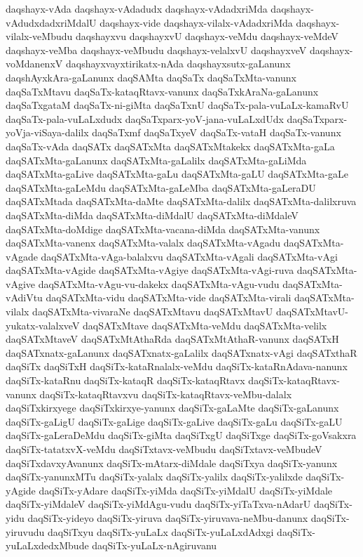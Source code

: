 {daqshayx-vAda
daqshayx-vAdadudx
daqshayx-vAdadxriMda
daqshayx-vAdudxdadxriMdalU
daqshayx-vide
daqshayx-vilalx-vAdadxriMda
daqshayx-vilalx-veMbudu
daqshayxvu
daqshayxvU
daqshayx-veMdu
daqshayx-veMdeV
daqshayx-veMba
daqshayx-veMbudu
daqshayx-velalxvU
daqshayxveV
daqshayx-voMdanenxV
daqshayxvayxtirikatx-nAda
daqshayxsutx-gaLanunx
daqshAyxkAra-gaLanunx
daqSAMta
daqSaTx
daqSaTxMta-vanunx
daqSaTxMtavu
daqSaTx-kataqRtavx-vanunx
daqSaTxkAraNa-gaLanunx
daqSaTxgataM
daqSaTx-ni-giMta
daqSaTxnU
daqSaTx-pala-vuLaLx-kamaRvU
daqSaTx-pala-vuLaLxdudx
daqSaTxparx-yoV-jana-vuLaLxdUdx
daqSaTxparx-yoVja-viSaya-dalilx
daqSaTxmf
daqSaTxyeV
daqSaTx-vataH
daqSaTx-vanunx
daqSaTx-vAda
daqSATx
daqSATxMta
daqSATxMtakekx
daqSATxMta-gaLa
daqSATxMta-gaLanunx
daqSATxMta-gaLalilx
daqSATxMta-gaLiMda
daqSATxMta-gaLive
daqSATxMta-gaLu
daqSATxMta-gaLU
daqSATxMta-gaLe
daqSATxMta-gaLeMdu
daqSATxMta-gaLeMba
daqSATxMta-gaLeraDU
daqSATxMtada
daqSATxMta-daMte
daqSATxMta-dalilx
daqSATxMta-dalilxruva
daqSATxMta-diMda
daqSATxMta-diMdalU
daqSATxMta-diMdaleV
daqSATxMta-doMdige
daqSATxMta-vacana-diMda
daqSATxMta-vanunx
daqSATxMta-vanenx
daqSATxMta-valalx
daqSATxMta-vAgadu
daqSATxMta-vAgade
daqSATxMta-vAga-balalxvu
daqSATxMta-vAgali
daqSATxMta-vAgi
daqSATxMta-vAgide
daqSATxMta-vAgiye
daqSATxMta-vAgi-ruva
daqSATxMta-vAgive
daqSATxMta-vAgu-vu-dakekx
daqSATxMta-vAgu-vudu
daqSATxMta-vAdiVtu
daqSATxMta-vidu
daqSATxMta-vide
daqSATxMta-virali
daqSATxMta-vilalx
daqSATxMta-vivaraNe
daqSATxMtavu
daqSATxMtavU
daqSATxMtavU-yukatx-valalxveV
daqSATxMtave
daqSATxMta-veMdu
daqSATxMta-velilx
daqSATxMtaveV
daqSATxMtAthaRda
daqSATxMtAthaR-vanunx
daqSATxH
daqSATxnatx-gaLanunx
daqSATxnatx-gaLalilx
daqSATxnatx-vAgi
daqSATxthaR
daqSiTx
daqSiTxH
daqSiTx-kataRnalalx-veMdu
daqSiTx-kataRnAdava-nanunx
daqSiTx-kataRnu
daqSiTx-kataqR
daqSiTx-kataqRtavx
daqSiTx-kataqRtavx-vanunx
daqSiTx-kataqRtavxvu
daqSiTx-kataqRtavx-veMbu-dalalx
daqSiTxkirxyege
daqSiTxkirxye-yanunx
daqSiTx-gaLaMte
daqSiTx-gaLanunx
daqSiTx-gaLigU
daqSiTx-gaLige
daqSiTx-gaLive
daqSiTx-gaLu
daqSiTx-gaLU
daqSiTx-gaLeraDeMdu
daqSiTx-giMta
daqSiTxgU
daqSiTxge
daqSiTx-goVsakxra
daqSiTx-tatatxvX-veMdu
daqSiTxtavx-veMbudu
daqSiTxtavx-veMbudeV
daqSiTxdavxyAvanunx
daqSiTx-mAtarx-diMdale
daqSiTxya
daqSiTx-yanunx
daqSiTx-yanunxMTu
daqSiTx-yalalx
daqSiTx-yalilx
daqSiTx-yalilxde
daqSiTx-yAgide
daqSiTx-yAdare
daqSiTx-yiMda
daqSiTx-yiMdalU
daqSiTx-yiMdale
daqSiTx-yiMdaleV
daqSiTx-yiMdAgu-vudu
daqSiTx-yiTaTxva-nAdarU
daqSiTx-yidu
daqSiTx-yideyo
daqSiTx-yiruva
daqSiTx-yiruvava-neMbu-danunx
daqSiTx-yiruvudu
daqSiTxyu
daqSiTx-yuLaLx
daqSiTx-yuLaLxdAdxgi
daqSiTx-yuLaLxdedxMbude
daqSiTx-yuLaLx-nAgiruvanu
}
